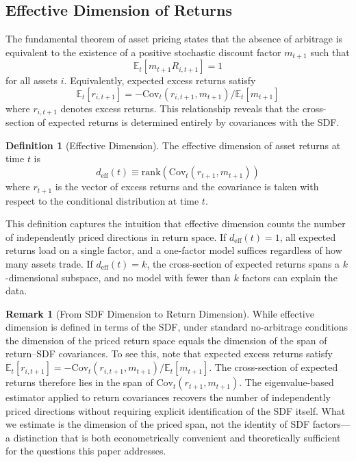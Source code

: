 \documentclass[12pt,letterpaper]{article}
\theoremstyle{plain}
\theoremstyle{definition}
\newtheorem{definition}{Definition}
\newtheorem{remark}{Remark}
\newcommand{\E}{\mathbb{E}}
\newcommand{\Cov}{\mathrm{Cov}}
\newcommand{\rank}{\mathrm{rank}}
\newcommand{\SDF}{m}
\newcommand{\deff}{d_{\text{eff}}}
\begin{document}
\subsection{Effective Dimension of Returns}\label{subsec:dimension_def}

The fundamental theorem of asset pricing states that the absence of arbitrage is equivalent to the existence of a positive stochastic discount factor $\SDF_{t+1}$ such that
\begin{equation}\label{eq:sdf}
\E_t[\SDF_{t+1} R_{i,t+1}] = 1
\end{equation}
for all assets $i$. Equivalently, expected excess returns satisfy
\begin{equation}\label{eq:expected_return}
\E_t[r_{i,t+1}] = -\Cov_t(r_{i,t+1}, \SDF_{t+1}) / \E_t[\SDF_{t+1}]
\end{equation}
where $r_{i,t+1}$ denotes excess returns. This relationship reveals that the cross-section of expected returns is determined entirely by covariances with the SDF.

\begin{definition}[Effective Dimension]\label{def:effective_dim}
The effective dimension of asset returns at time $t$ is
\begin{equation}\label{eq:deff}
\deff(t) \equiv \rank\left(\Cov_t(r_{t+1}, \SDF_{t+1})\right)
\end{equation}
where $r_{t+1}$ is the vector of excess returns and the covariance is taken with respect to the conditional distribution at time $t$.
\end{definition}

This definition captures the intuition that effective dimension counts the number of independently priced directions in return space. If $\deff(t) = 1$, all expected returns load on a single factor, and a one-factor model suffices regardless of how many assets trade. If $\deff(t) = k$, the cross-section of expected returns spans a $k$-dimensional subspace, and no model with fewer than $k$ factors can explain the data.

\begin{remark}[From SDF Dimension to Return Dimension]\label{rem:sdf_return}
While effective dimension is defined in terms of the SDF, under standard no-arbitrage conditions the dimension of the priced return space equals the dimension of the span of return--SDF covariances. To see this, note that expected excess returns satisfy $\E_t[r_{i,t+1}] = -\Cov_t(r_{i,t+1}, \SDF_{t+1})/\E_t[\SDF_{t+1}]$. The cross-section of expected returns therefore lies in the span of $\Cov_t(r_{t+1}, \SDF_{t+1})$. The eigenvalue-based estimator applied to return covariances recovers the number of independently priced directions without requiring explicit identification of the SDF itself. What we estimate is the dimension of the priced span, not the identity of SDF factors---a distinction that is both econometrically convenient and theoretically sufficient for the questions this paper addresses.
\end{remark}
\end{document}
